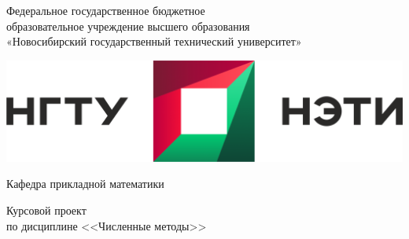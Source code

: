 \documentclass[12pt,a4paper]{article}
\begin{document}
    \begin{center}
    \begin{large}

    \vspace{8mm}

    Федеральное государственное бюджетное                   \\
    образовательное учреждение высшего образования          \\
    «Новосибирский государственный технический университет» \\
    \vspace{12mm}


    \includegraphics[scale=0.35]{images/nstu_emblem_with_title}
    \vspace{8mm}

    Кафедра прикладной математики
    \vspace{4mm}

    Курсовой проект                   \\
    по дисциплине <<Численные методы>>\\                %
    \vspace{16mm}
    \end{large}



\end{center}
\end{document}
